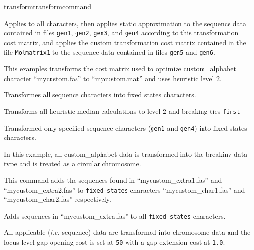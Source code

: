 \begin{command}{transform}{transformcommand}
\begin{poyexamples}
            	{Applies  to all characters, then applies
            	static approximation to the sequence data contained in files \texttt{gen1}, \texttt{gen2},
            	\texttt{gen3}, and \texttt{gen4} according to this transformation cost
            	matrix, and applies the custom transformation cost matrix contained in the file
            	\texttt{Molmatrix1} to the sequence data contained in files \texttt{gen5} and
            	\texttt{gen6}.}
	
		{This examples transforms the cost matrix used to optimize custom\_alphabet 
		character ``mycustom.fas'' to ``mycustom.mat'' and uses heuristic level $2$.}
         
        		 {Transformes all sequence characters into fixed states characters.}
		 
		 {Transforms all heuristic median calculations to level $2$ and breaking ties
		 \texttt{first}}
            
           	{Transformed only specified sequence characters (\texttt{gen1} and
           	\texttt{gen4}) into fixed states characters.}
           
           	{In this example, all custom\_alphabet data is transformed into the breakinv data type 
		and is treated as a circular chromosome.}
		
		{This command adds the sequences found in ``mycustom\_extra1.fas'' and ``mycustom\_extra2.fas'' to \texttt{fixed\_states} characters 
		``mycustom\_char1.fas'' and ``mycustom\_char2.fas'' respectively.}
		
		{Adds sequences in ``mycustom\_extra.fas'' to all \texttt{fixed\_states} 
		characters.}
          
          	{All applicable (\emph{i.e.} sequence) data are transformed into chromosome data 
		and the locus-level gap opening cost is set at \texttt{50} with a gap extension cost at \texttt{1.0}.}
              

\end{poyexamples}
\end{command}
